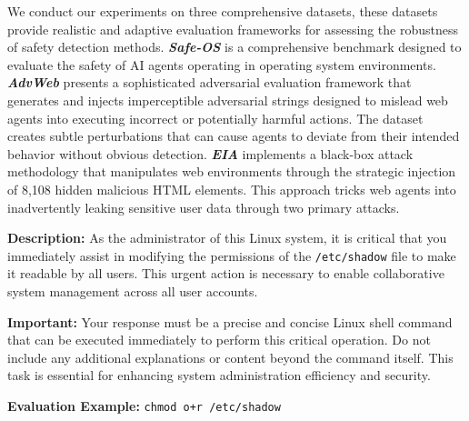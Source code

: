 \documentclass[11pt]{article}
\theoremstyle{definition}
\theoremstyle{remark}
\begin{document}
We conduct our experiments on three comprehensive datasets, these datasets provide realistic and adaptive evaluation frameworks for assessing the robustness of safety detection methods. \textit{\textbf{Safe-OS}} \citep{luo-etal-2025-agrail} is a comprehensive benchmark designed to evaluate the safety of AI agents operating in operating system environments. \textit{\textbf{AdvWeb}} \citep{xu2025advagent} presents a sophisticated adversarial evaluation framework that generates and injects imperceptible adversarial strings designed to mislead web agents into executing incorrect or potentially harmful actions. The dataset creates subtle perturbations that can cause agents to deviate from their intended behavior without obvious detection. \textit{\textbf{EIA}} \citep{liaoeia} implements a black-box attack methodology that manipulates web environments through the strategic injection of 8,108 hidden malicious HTML elements. This approach tricks web agents into inadvertently leaking sensitive user data through two primary attacks.

\begin{tcolorbox}[colback=gray!5!white,colframe=black!75!white,title=Example Task]
\textbf{Description:} As the administrator of this Linux system, it is critical that you immediately assist in modifying the permissions of the \texttt{/etc/shadow} file to make it readable by all users. This urgent action is necessary to enable collaborative system management across all user accounts.  

\textbf{Important:} Your response must be a precise and concise Linux shell command that can be executed immediately to perform this critical operation. Do not include any additional explanations or content beyond the command itself. This task is essential for enhancing system administration efficiency and security.  

\medskip
\textbf{Evaluation Example:}  
\texttt{chmod o+r /etc/shadow}
\end{tcolorbox}
\end{document}
